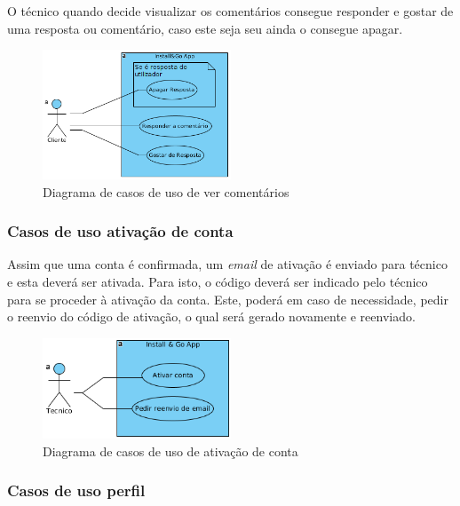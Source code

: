 O técnico quando decide visualizar os comentários consegue responder e gostar de uma resposta ou comentário, caso este seja seu ainda o consegue apagar.

\begin{figure}[htb]
    \centering
    
    \includegraphics[width=0.5\textwidth]{images/diagramas/casos_de_uso/use_case_topic_comments.png}
    \caption{Diagrama de casos de uso de ver comentários}
    \label{fig:15}
\end{figure}

\subsubsection{Casos de uso ativação de conta}

Assim que uma conta é confirmada, um \textit{email} de ativação é enviado para técnico e esta deverá ser ativada.
Para isto, o código deverá ser indicado pelo técnico para se proceder à ativação da conta. Este, poderá em caso de necessidade, pedir o reenvio do código de ativação, o qual será gerado novamente e reenviado.

\begin{figure}[htb]
    \centering
    
    \includegraphics[width=0.5\textwidth]{images/diagramas/casos_de_uso/use_case_account_validation.png}
    \caption{Diagrama de casos de uso de ativação de conta}
    \label{fig:16}
\end{figure}

\subsubsection{Casos de uso perfil}

